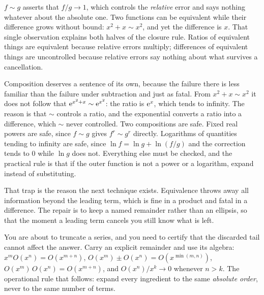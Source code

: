 \begin{keynote}
$f\sim g$ asserts that $f/g\to1$, which controls the \emph{relative} error and says nothing whatever about the absolute one. Two functions can be equivalent while their difference grows without bound: $x^{2}+x\sim x^{2}$, and yet the difference is $x$. That single observation explains both halves of the closure rule. Ratios of equivalent things are equivalent because relative errors multiply; differences of equivalent things are uncontrolled because relative errors say nothing about what survives a cancellation.
\end{keynote}

Composition deserves a sentence of its own, because the failure there is less familiar than the failure under subtraction and just as fatal. From $x^{2}+x\sim x^{2}$ it does not follow that $\mathrm{e}^{x^{2}+x}\sim\mathrm{e}^{x^{2}}$: the ratio is $\mathrm{e}^{x}$, which tends to infinity. The reason is that $\sim$ controls a ratio, and the exponential converts a ratio into a difference, which $\sim$ never controlled. Two compositions are safe. Fixed real powers are safe, since $f\sim g$ gives $f^{r}\sim g^{r}$ directly. Logarithms of quantities tending to infinity are safe, since $\ln f=\ln g+\ln(f/g)$ and the correction tends to $0$ while $\ln g$ does not. Everything else must be checked, and the practical rule is that if the outer function is not a power or a logarithm, expand instead of substituting.

That trap is the reason the next technique exists. Equivalence throws away all information beyond the leading term, which is fine in a product and fatal in a difference. The repair is to keep a named remainder rather than an ellipsis, so that the moment a leading term cancels you still know what is left.

\cue You are about to truncate a series, and you need to certify that the discarded tail cannot affect the answer.
\method Carry an explicit remainder and use its algebra: $x^{m}O(x^{n})=O(x^{m+n})$, $O(x^{m})\pm O(x^{n})=O(x^{\min(m,n)})$, $O(x^{m})\,O(x^{n})=O(x^{m+n})$, and $O(x^{n})/x^{k}\to0$ whenever $n>k$. The operational rule that follows: expand every ingredient to the same \emph{absolute order}, never to the same number of terms.

